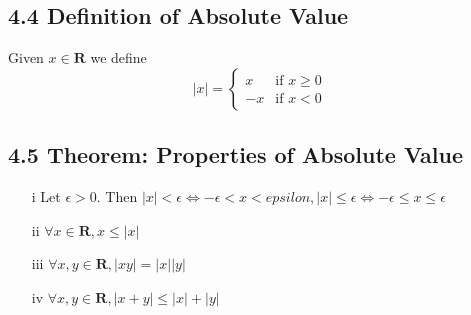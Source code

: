 \documentclass{article}
\begin{document}
\subsection*{4.4 Definition of Absolute Value}
Given $x \in \mathbf{R}$ we define
\begin{equation*}
    |x| = \begin{cases}
        x & \textrm{if } x \geq 0\\
        -x & \textrm{if } x < 0
    \end{cases}
\end{equation*}
\subsection*{4.5 Theorem: Properties of Absolute Value}
\begin{itemize}
    \item[i] Let $\epsilon > 0$. Then $|x| < \epsilon \iff -\epsilon < x < epsilon, |x| \leq \epsilon \iff -\epsilon \leq x \leq \epsilon$
    \item[ii] $\forall x \in \mathbf{R}, x \leq |x|$
    \item[iii] $\forall x, y \in \mathbf{R}, |xy| = |x||y|$
    \item[iv] $\forall x, y \in \mathbf{R}, |x + y| \leq |x| + |y|$
\end{itemize}
\end{document}
